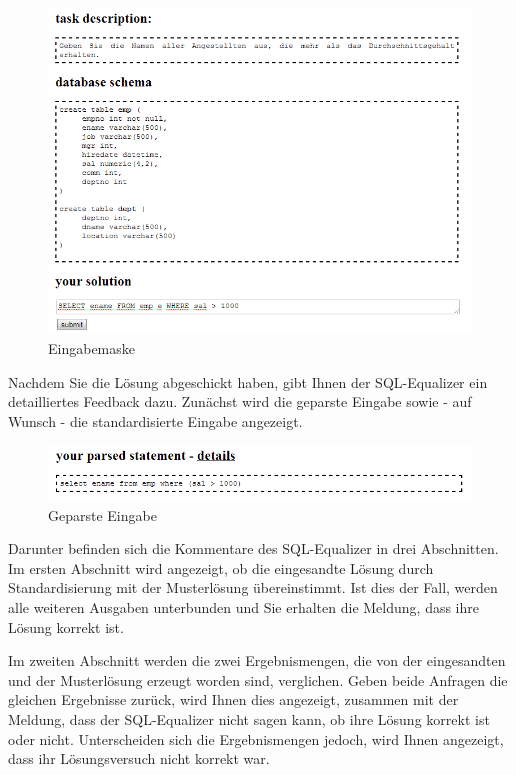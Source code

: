 \documentclass[12pt]{scrreprt}
\theoremstyle{remark}
\begin{document}
\begin{figure}[h]
\centering
\includegraphics[scale=0.6]{Bilder/screen_user_4.png}
\caption{Eingabemaske}
\label{fig:maske1}
\end{figure}


Nachdem Sie die Lösung abgeschickt haben, gibt Ihnen der SQL-Equalizer ein detailliertes Feedback dazu. Zunächst wird die geparste Eingabe sowie - auf Wunsch - die standardisierte Eingabe angezeigt.

\begin{figure}[H]
\centering
\includegraphics[scale=0.6]{Bilder/screen_user_5.png}
\caption{Geparste Eingabe}
\end{figure}

Darunter befinden sich die Kommentare des SQL-Equalizer in drei Abschnitten. Im ersten Abschnitt wird angezeigt, ob die eingesandte Lösung durch Standardisierung mit der Musterlösung übereinstimmt. Ist dies der Fall, werden alle weiteren Ausgaben unterbunden und Sie erhalten die Meldung, dass ihre Lösung korrekt ist.

Im zweiten Abschnitt werden die zwei Ergebnismengen, die von der eingesandten und der Musterlösung erzeugt worden sind, verglichen. Geben beide Anfragen die gleichen Ergebnisse zurück, wird Ihnen dies angezeigt, zusammen mit der Meldung, dass der SQL-Equalizer nicht sagen kann, ob ihre Lösung korrekt ist oder nicht. Unterscheiden sich die Ergebnismengen jedoch, wird Ihnen angezeigt, dass ihr Lösungsversuch nicht korrekt war.
\end{document}

